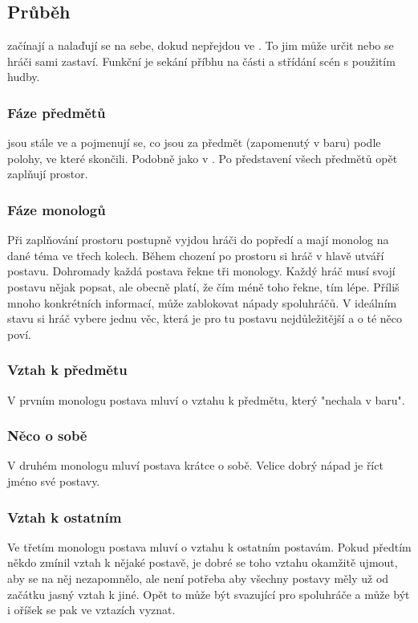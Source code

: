 \subsection{ Průběh }  začínají  a nalaďují se na sebe, dokud nepřejdou ve . To jim může určit  nebo se hráči sami zastaví.  
Funkční je sekání příbhu na části a střídání scén s použitím hudby. 
 
\subsubsection{ Fáze předmětů }  jsou stále ve  a pojmenují se, co jsou za předmět (zapomenutý v baru) podle polohy, ve které skončili. Podobně jako v . Po představení všech předmětů opět zaplňují prostor. 
 
\subsubsection{ Fáze monologů } Při zaplňování prostoru postupně vyjdou hráči do popředí a mají monolog na dané téma ve třech kolech. Během chození po prostoru si hráč v hlavě utváří postavu. Dohromady každá postava řekne tři monology. Každý hráč musí svojí postavu nějak popsat, ale obecně platí, že čím méně toho řekne, tím lépe. Příliš mnoho konkrétních informací, může zablokovat nápady spoluhráčů. V ideálním stavu si hráč vybere jednu věc, která je pro tu postavu nejdůležitější a o té něco poví. 
 
\subsubsection{ Vztah k předmětu } V prvním monologu postava mluví o vztahu k předmětu, který "nechala v baru".  
 
\subsubsection{ Něco o sobě } V druhém monologu mluví postava krátce o sobě. Velice dobrý nápad je říct jméno své postavy. 
 
\subsubsection{ Vztah k ostatním } Ve třetím monologu postava mluví o vztahu k ostatním postavám. Pokud předtím někdo zmínil vztah k nějaké postavě, je dobré se toho vztahu okamžitě ujmout, aby se na něj nezapomnělo, ale není potřeba aby všechny postavy měly už od začátku jasný vztah k jiné. Opět to může být svazující pro spoluhráče a může být i oříšek se pak ve vztazích vyznat. 
 
